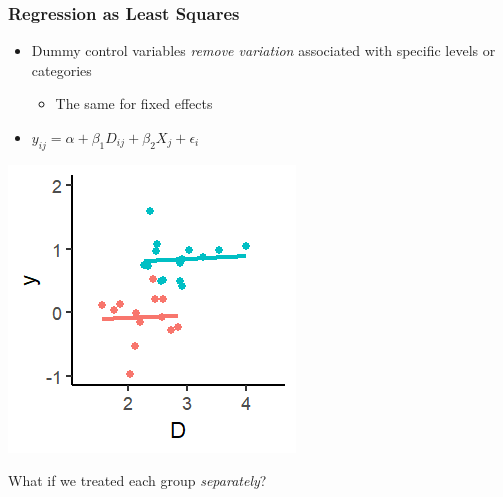 \documentclass[xcolor=x11names,compress]{beamer}\usepackage[]{graphicx}\usepackage[]{color}
\makeatletter
\def\maxwidth{ %
  \ifdim\Gin@nat@width>\linewidth
    \linewidth
  \else
    \Gin@nat@width
  \fi
}
\newenvironment{knitrout}{}{} %
\renewcommand{\(}{\begin{columns}}
\renewcommand{\)}{\end{columns}}
\newcommand{\<}[1]{\begin{column}{#1}}
\renewcommand{\>}{\end{column}}
\makeatother
\begin{document}
\begin{frame}
\frametitle{Regression as Least Squares}
\begin{itemize}
\item Dummy control variables \textit{remove variation} associated with specific levels or categories
\begin{itemize}
\item The same for fixed effects
\end{itemize}
\item $y_{ij} = \alpha + \beta_1 D_{ij} + \beta_2 X_j + \epsilon_i$
\end{itemize}
\begin{multicols}{2}
\begin{knitrout}
\color{fgcolor}
\includegraphics[width=\maxwidth]{figure/graph_ols_FE3-1} 

\end{knitrout}
\columnbreak
What if we treated each group \textit{separately}?
\end{multicols}
\end{frame}
\end{document}
